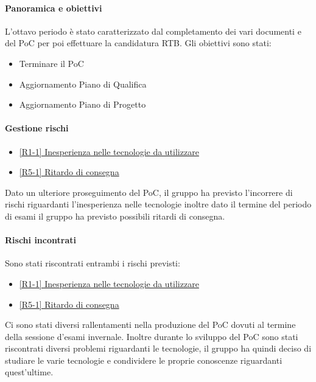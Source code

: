 \documentclass[a4paper,12pt]{article}
\begin{document}
            \paragraph{Panoramica e obiettivi}
            L'ottavo periodo è stato caratterizzato dal completamento dei vari documenti e del PoC per poi effettuare la candidatura RTB. Gli obiettivi sono stati:
            \begin{itemize}
                \item Terminare il PoC
                \item Aggiornamento Piano di Qualifica
                \item Aggiornamento Piano di Progetto
            \end{itemize}
            
            \paragraph{Gestione rischi}
                \begin{itemize}
                \item\hyperref[tab:r1]{[R1-1] Inesperienza nelle tecnologie da utilizzare}
                \item\hyperref[tab:r5]{[R5-1] Ritardo di consegna}
                \end{itemize}
                Dato un ulteriore proseguimento del PoC, il gruppo ha previsto l'incorrere di rischi riguardanti l'inesperienza nelle tecnologie inoltre dato il termine del periodo di esami il gruppo ha previsto possibili ritardi di consegna.
    
                \paragraph*{Rischi incontrati}
                Sono stati riscontrati entrambi i rischi previsti:
                \\
                \begin{itemize}
                    \item \hyperref[tab:r1]{[R1-1] Inesperienza nelle tecnologie da utilizzare}
                    \item \hyperref[tab:r5]{[R5-1] Ritardo di consegna}
                \end{itemize}
                Ci sono stati diversi rallentamenti nella produzione del PoC dovuti al termine della sessione d'esami invernale. Inoltre durante lo sviluppo del PoC sono stati riscontrati diversi problemi riguardanti le tecnologie, il gruppo ha quindi deciso di studiare le varie tecnologie e condividere le proprie conoscenze riguardanti quest'ultime.
                
\end{document}

